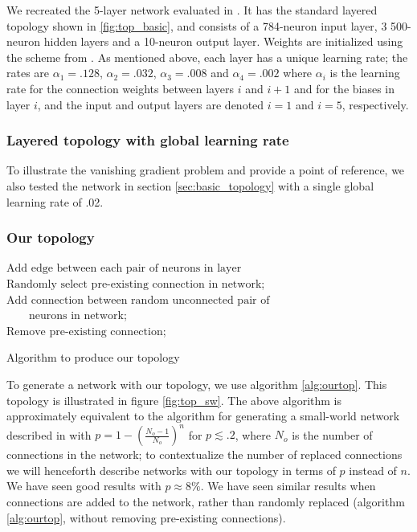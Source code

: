 \documentclass[utf8]{frontiersSCNS}
\begin{document}
We recreated the 5-layer network evaluated in \citep{scellier17}. It has the standard layered topology shown in \ref{fig:top_basic}, and consists of a 784-neuron input layer, 3 500-neuron hidden layers and a 10-neuron output layer. Weights are initialized using the scheme from \citep{glorot2010}. As mentioned above, each layer has a unique learning rate; the rates are $\alpha_1=.128$, $\alpha_2=.032$, $\alpha_3=.008$ and $\alpha_4=.002$ where $\alpha_i$ is the learning rate for the connection weights between layers $i$ and $i+1$ and for the biases in layer $i$, and the input and output layers are denoted $i=1$ and $i=5$, respectively.

\subsubsection{Layered topology with global learning rate}
\label{sec:basic_topology_uniform}

To illustrate the vanishing gradient problem and provide a point of reference, we also tested the network in section \ref{sec:basic_topology} with a single global learning rate of .02.

\subsubsection{Our topology}
\label{sec:our_topology}

\begin{algorithm}
{
	$\text{Add edge between each pair of neurons in layer}$
}
{
	$\text{Randomly select pre-existing connection in network}$;\\
	$\text{Add connection between random unconnected pair of}$\\
	$\qquad\text{neurons in network}$;\\
	$\text{Remove pre-existing connection}$;
}
\caption{Algorithm to produce our topology} \label{alg:ourtop}
\end{algorithm}

To generate a network with our topology, we use algorithm \ref{alg:ourtop}. This topology is illustrated in figure \ref{fig:top_sw}. The above algorithm is approximately equivalent to the algorithm for generating a small-world network described in \citep{watts98} with $p=1-(\frac{N_o-1}{N_o})^n$ for $p\lesssim .2$, where $N_o$ is the number of connections in the network; to contextualize the number of replaced connections we will henceforth describe networks with our topology in terms of $p$ instead of $n$. We have seen good results with $p\approx 8\%$. We have seen similar results when connections are added to the network, rather than randomly replaced (algorithm \ref{alg:ourtop}, without removing pre-existing connections).
\end{document}
